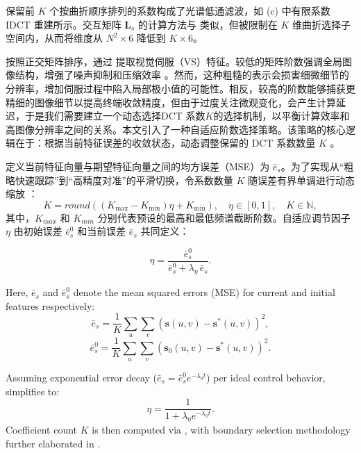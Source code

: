 \documentclass{article}
\begin{document}
保留前 \(K\) 个按曲折顺序排列的系数构成了光谱低通滤波，如 (c) 中有限系数 IDCT 重建所示。交互矩阵 \(\boldsymbol{L}_s\) 的计算方法与  类似，但被限制在 \(K\) 维曲折选择子空间内，从而将维度从 \(N^2 \times 6\) 降低到 \(K \times 6\)。


按照正交矩阵排序，通过  提取视觉伺服（VS）特征。较低的矩阵阶数强调全局图像结构，增强了噪声抑制和压缩效率 \cite{chen2024direct}。然而，这种粗糙的表示会损害细微细节的分辨率，增加伺服过程中陷入局部极小值的可能性。相反，较高的阶数能够捕获更精细的图像细节以提高终端收敛精度，但由于过度关注微观变化，会产生计算延迟，于是我们需要建立一个动态选择DCT 系数\(K\)的选择机制，以平衡计算效率和高图像分辨率之间的关系。本文引入了一种自适应阶数选择策略。该策略的核心逻辑在于：根据当前特征误差的收敛状态，动态调整保留的 DCT 系数数量 $K$ 。

定义当前特征向量与期望特征向量之间的均方误差（MSE）为 $\bar{e}_s$。为了实现从“粗略快速跟踪”到“高精度对准”的平滑切换，令系数数量 $K$ 随误差有界单调进行动态缩放 ：
\begin{equation}
K = round(\left(K_{\max} - K_{\min}\right) \eta + K_{\min}), \quad \eta \in [0, 1], \quad K \in \mathbb{N},
\end{equation}
其中，$K_{max}$ 和 $K_{min}$ 分别代表预设的最高和最低频谱截断阶数。自适应调节因子 $\eta$ 由初始误差 $\bar{e}_s^0$ 和当前误差 $\bar{e}_s$ 共同定义：

\begin{equation}
\eta = \frac{\bar{e}_s^0}{\bar{e}_s^0 + \lambda_\eta \, \bar{e}_s}.
\end{equation}

Here, \(\bar{e}_s\) and \(\bar{e}_s^0\) denote the mean squared errors (MSE) for current and initial features respectively:
\begin{equation}
\bar{e}_s = \frac{1}{K} \sum_u \sum_v \left(\boldsymbol{s}(u, v) - \boldsymbol{s}^{*}(u, v)\right)^2,
\end{equation}
\begin{equation}
\bar{e}_s^0 = \frac{1}{K} \sum_u \sum_v \left(\boldsymbol{s}_0(u, v) - \boldsymbol{s}^{*}(u, v)\right)^2.
\end{equation}

Assuming exponential error decay (\(\bar{e}_s = \bar{e}_s^0 e^{-\lambda_0 t}\)) per ideal control behavior,  simplifies to:
\begin{equation}
\eta = \frac{1}{1 + \lambda_\eta e^{-\lambda_0 t}}.
\end{equation}
Coefficient count \(K\) is then computed via , with boundary selection methodology further elaborated in .
\end{document}
